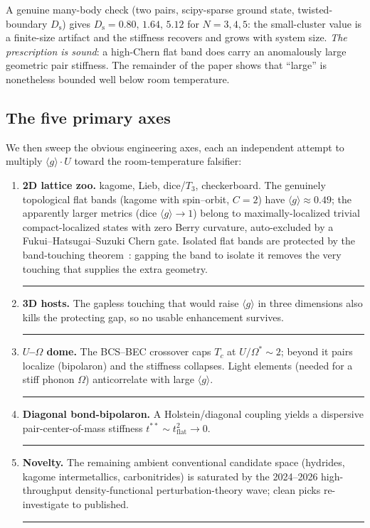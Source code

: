 \documentclass[11pt,a4paper]{article}
\newcommand{\tierdisc}[1]{\textcolor{#1}{\rule[0.05ex]{1.0ex}{1.0ex}}}
\newcommand{\tierRed}{\tierdisc{red!80!black}}     %
\newcommand{\qgg}{\langle g \rangle}
\newcommand{\Ds}{D_{\mathrm{s}}}
\begin{document}
A genuine many-body check (two pairs, scipy-sparse ground state, twisted-boundary $\Ds$) gives
$\Ds = 0.80,\,1.64,\,5.12$ for $N=3,4,5$: the small-cluster value is a finite-size artifact and
the stiffness recovers and grows with system size. \emph{The prescription is sound}: a high-Chern
flat band does carry an anomalously large geometric pair stiffness. The remainder of the paper
shows that ``large'' is nonetheless bounded well below room temperature.

\subsection{The five primary axes}
We then sweep the obvious engineering axes, each an independent attempt to multiply
$\qgg\!\cdot\!U$ toward the room-temperature falsifier:
\begin{enumerate}
\item \textbf{2D lattice zoo.} kagome, Lieb, dice/$T_3$, checkerboard. The genuinely topological
flat bands (kagome with spin--orbit, $C=2$) have $\qgg\approx0.49$; the apparently larger metrics
(dice $\qgg\to1$) belong to maximally-localized trivial compact-localized states with zero Berry
curvature, auto-excluded by a Fukui--Hatsugai--Suzuki Chern gate. Isolated flat bands are protected
by the band-touching theorem~\citep{bergman2008}: gapping the band to isolate it removes the very
touching that supplies the extra geometry. \tierRed{}
\item \textbf{3D hosts.} The gapless touching that would raise $\qgg$ in three dimensions also kills
the protecting gap, so no usable enhancement survives. \tierRed{}
\item \textbf{$U$--$\Omega$ dome.} The BCS--BEC crossover caps $T_c$ at $U/\Omega^\ast \sim 2$;
beyond it pairs localize (bipolaron) and the stiffness collapses. Light elements (needed for a
stiff phonon $\Omega$) anticorrelate with large $\qgg$. \tierRed{}
\item \textbf{Diagonal bond-bipolaron.} A Holstein/diagonal coupling yields a dispersive
pair-center-of-mass stiffness $t^{\ast\ast}\sim t_{\mathrm{flat}}^2 \to 0$. \tierRed{}
\item \textbf{Novelty.} The remaining ambient conventional candidate space (hydrides, kagome
intermetallics, carbonitrides) is saturated by the 2024--2026 high-throughput density-functional
perturbation-theory wave; clean picks re-investigate to published. \tierRed{}
\end{enumerate}
\end{document}
